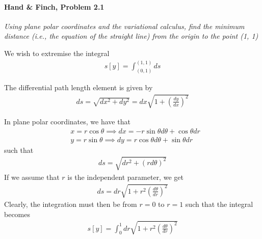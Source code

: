 \documentclass[a4paper]{article}
\begin{document}
    \paragraph{Hand \& Finch, Problem 2.1}
    \textit{Using plane polar coordinates and the variational calculus, find the minimum distance (i.e., the equation of the straight line) from the origin to the point (1, 1)}

    We wish to extremise the integral \begin{align*}
        s[y] = \int_{(0, 1)} ^{(1, 1)} ds
    \end{align*}

    The differential path length element is given by \begin{align*}
        ds = \sqrt{dx^{2}  + dy^{2} } = dx\sqrt{1 + \left( \frac{dy}{dx} \right)^{2}} 
    \end{align*}

    In plane polar coordinates, we have that \begin{align*}
        &x = r \cos \theta \implies dx = -r \sin \theta d \theta + \cos \theta dr\\
        &y = r \sin \theta \implies dy = r\cos \theta d \theta + \sin \theta d r
    \end{align*}
    such that \begin{align*}
        ds = \sqrt{dr ^{2} + (r d \theta )^{2}} 
    \end{align*}
    If we assume that \(r\) is the independent parameter, we get \begin{align*}
        ds = dr\sqrt{1 + r^{2} \left( \frac{d \theta }{d r} \right)^{2}} 
    \end{align*}
    Clearly, the integration must then be from \(r = 0\) to \(r = 1\) such that the integral becomes \begin{align*}
        s[y] = \int_{0}^1 dr \sqrt{1 + r^{2} \left( \frac{d \theta }{d r} \right)^{2}} 
    \end{align*} 
\end{document}
